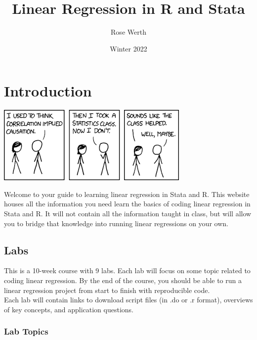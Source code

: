 \documentclass[
]{book}
\title{Linear Regression in R and Stata}
\author{Rose Werth}
\date{Winter 2022}
\begin{document}
\maketitle

{
\setcounter{tocdepth}{1}
\tableofcontents
}
\hypertarget{introduction}{%
\chapter{Introduction}\label{introduction}}

\includegraphics[width=0.75\linewidth]{images/causationcartoon}

Welcome to your guide to learning linear regression in Stata and R. This website houses all the information you need learn the basics of coding linear regression in Stata and R. It will not contain all the information taught in class, but will allow you to bridge that knowledge into running linear regressions on your own.

\hypertarget{labs}{%
\section{Labs}\label{labs}}

This is a 10-week course with 9 labs. Each lab will focus on some topic related to coding linear regression. By the end of the course, you should be able to run a linear regression project from start to finish with reproducible code.\\
Each lab will contain links to download script files (in .do or .r format), overviews of key concepts, and application questions.

\hypertarget{lab-topics}{%
\subsection*{Lab Topics}\label{lab-topics}}
\end{document}

